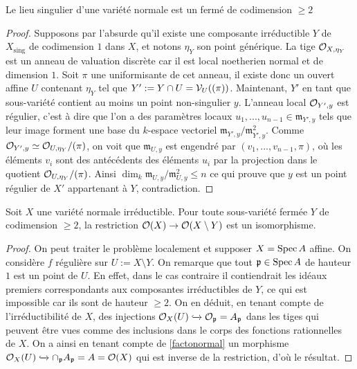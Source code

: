 \begin{prop}\label{codimesingnormal}
Le lieu singulier d'une variété normale est un fermé de codimension $\geq 2$
\end{prop}
\begin{proof}
Supposons par l'absurde qu'il existe une composante irréductible $Y$ de $X_{\text{sing}}$ de codimension $1$ dans $X$, et notons $\eta_Y$ son point générique. La tige $\mathcal{O}_{X,\eta_Y}$ est un anneau de valuation discrète car il est local noetherien normal et de dimension $1$. Soit $\pi$ une uniformisante de cet anneau, il existe donc un ouvert affine $U$ contenant $\eta_Y$ tel que $Y':=Y\cap U=\mathcal{V}_U((\pi))$. Maintenant, $Y'$ en tant que sous-variété contient au moins un point non-singulier $y$. L'anneau local $\mathcal{O}_{Y',y}$ est régulier, c'est à dire que l'on a des paramètres locaux $u_1,...,u_{n-1}\in\mathfrak{m}_{Y',y}$ tels que leur image forment une base du $k$-espace vectoriel $\mathfrak{m}_{Y',y}/\mathfrak{m}_{Y',y}^2$. Comme $\mathcal{O}_{Y',y}\simeq \mathcal{O}_{U,\eta_Y}/(\pi)$, on voit que $\mathfrak{m}_{U,y}$ est engendré par $(v_1,...,v_{n-1},\pi)$, où les éléments $v_i$ sont des antécédents des éléments $u_i$ par la projection dans le quotient $\mathcal{O}_{U,\eta_Y}/(\pi)$. Ainsi $\dim_k \mathfrak{m}_{U,y}/\mathfrak{m}_{U,y}^2\leq n$ ce qui prouve que $y$ est un point régulier de $X'$ appartenant à $Y$, contradiction.
\end{proof}


\begin{prop}\label{extregularnormal}
Soit $X$ une variété normale irréductible. Pour toute sous-variété fermée $Y$ de codimension $\geq 2$, la restriction $\mathcal{O}(X)\rightarrow \mathcal{O}(X\setminus Y)$ est un isomorphisme.
\end{prop}
\begin{proof}
On peut traiter le problème localement et supposer $X=\operatorname{Spec} A$ affine. On considère $f$ régulière sur $U:=X\setminus Y$. On remarque que tout $\mathfrak{p}\in \operatorname{Spec} A$ de hauteur $1$ est un point de $U$. En effet, dans le cas contraire il contiendrait les idéaux premiers correspondants aux composantes irréductibles de $Y$, ce qui est impossible car ils sont de hauteur $\geq 2$. On en déduit, en tenant compte de l'irréductibilité de $X$, des injections $\mathcal{O}_X(U)\xhookrightarrow{} \mathcal{O}_\mathfrak{p}=A_\mathfrak{p}$ dans les tiges qui peuvent être vues comme des inclusions dans le corps des fonctions rationnelles de $X$. On a ainsi en tenant compte de \ref{factonormal} un morphisme $\mathcal{O}_X(U)\xhookrightarrow{} \cap_\mathfrak{p} A_\mathfrak{p}=A=\mathcal{O}(X)$ qui est inverse de la restriction, d'où le résultat.
\end{proof}

